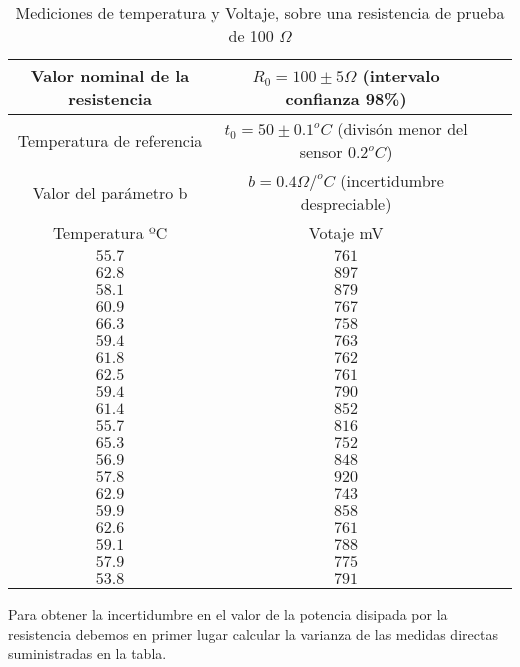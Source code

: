 \begin{table}[h]
\caption{Mediciones de temperatura y Voltaje, sobre una resistencia de prueba de 100 $\Omega$}
\label{tabres}
\centering
\begin{tabular}{cccc}
\hline
Valor nominal de la resistencia& $R_0=100 \pm 5 \Omega$ (intervalo confianza 98\%) \\ 
\hline
Temperatura de referencia& $t_0=50\pm 0.1 ^oC$ (divisón menor del sensor $0.2^oC$) \\
\hline
Valor del parámetro b& $b = 0.4\Omega / ^oC$ (incertidumbre despreciable)\\
\hline
\hline
Temperatura ºC& Votaje mV\\
\hline
 $55.7$&$761$\\
\hline 
 $62.8$&$897$\\
\hline 
 $58.1$&$879$\\
\hline 
 $60.9$&$767$\\
\hline 
 $66.3$&$758$\\
\hline 
 $59.4$&$763$\\
\hline 
 $61.8$&$762$\\
\hline 
 $62.5$&$761$\\
\hline 
 $59.4$&$790$\\
\hline 
 $61.4$&$852$\\
\hline 
 $55.7$&$816$\\
\hline 
 $65.3$&$752$\\
\hline 
 $56.9$&$848$\\
\hline 
 $57.8$&$920$\\
\hline 
 $62.9$&$743$\\
\hline 
 $59.9$&$858$\\
\hline 
 $62.6$&$761$\\
\hline 
 $59.1$&$788$\\
\hline 
 $57.9$&$775$\\
\hline
 $53.8$&$791$\\
\hline
\hline
\end{tabular}
\end{table}

Para obtener la incertidumbre en el valor de la potencia disipada por la resistencia debemos en primer lugar calcular la varianza de las medidas directas suministradas en la tabla.

